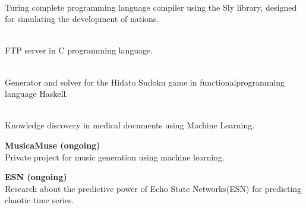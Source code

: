 \documentclass[9pt, blue]{./template/developercv} %
\begin{document}
\begin{minipage}[t]{0.70\textwidth}
	\vspace{1.2mm}
	\textcolor{accentbackground}{\faCode}\hspace{0.5mm}
	\small \textbf{} \\
	\footnotesize Turing complete programming language compiler using the Sly library, designed for simulating the development of nations.

	\vspace{1.2mm}
	\textcolor{accentbackground}{\faCode}\hspace{0.5mm}
	\small \textbf{} \\
	\footnotesize FTP server in C programming language.

	\vspace{1.2mm}
	\textcolor{accentbackground}{\faCode}\hspace{0.5mm}
	\small \textbf{} \\
	\footnotesize Generator and solver for the Hidato Sudoku game in functionalprogramming language Haskell.

	\vspace{1.2mm}
	\textcolor{accentbackground}{\faCode}\hspace{0.5mm}
	\small \textbf{} \\
	\footnotesize Knowledge discovery in medical documents using Machine Learning.

	\vspace{1.2mm}
	\textcolor{accentbackground}{\faCode}\hspace{0.5mm}
	\small \textbf{MusicaMuse (ongoing)} \\
	\footnotesize Private project for music generation using machine learning.

	\vspace{1.2mm}
	\textcolor{accentbackground}{\faCode}\hspace{0.5mm}
	\small \textbf{ESN (ongoing)} \\
	\footnotesize Research about the predictive power of Echo State Networks(ESN) for predicting chaotic time series.

\end{minipage}
\hfill
\end{document}
